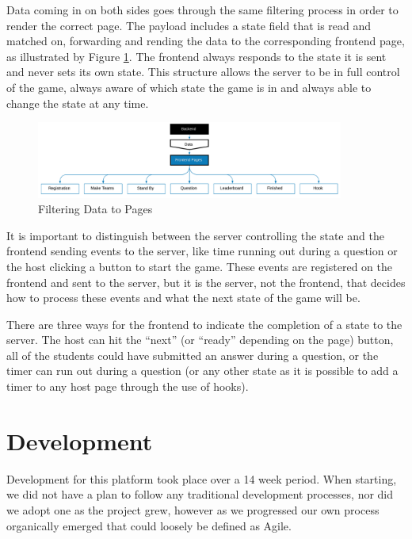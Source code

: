 \documentclass{article}
\begin{document}
            Data coming in on both sides goes through the same filtering process in order to render the correct page. The payload includes a state field that is read and matched on, forwarding and rending the data to the corresponding frontend page, as illustrated by Figure \ref{fig:frontend-pages}. The frontend always responds to the state it is sent and never sets its own state. This structure allows the server to be in full control of the game, always aware of which state the game is in and always able to change the state at any time.

            \begin{figure}[ht]
                \centering
                \includegraphics[width=0.9\textwidth]{images/frontend-pages.png}
                \caption{Filtering Data to Pages}
                \label{fig:frontend-pages}
            \end{figure}
            
            It is important to distinguish between the server controlling the state and the frontend sending events to the server, like time running out during a question or the host clicking a button to start the game. These events are registered on the frontend and sent to the server, but it is the server, not the frontend, that decides how to process these events and what the next state of the game will be.
            
            \smallskip
            There are three ways for the frontend to indicate the completion of a state to the server. The host can hit the ``next'' (or ``ready'' depending on the page) button, all of the students could have submitted an answer during a question, or the timer can run out during a question (or any other state as it is possible to add a timer to any host page through the use of hooks).

\section{Development}
    Development for this platform took place over a 14 week period. When starting, we did not have a plan to follow any traditional development processes, nor did we adopt one as the project grew, however as we progressed our own process organically emerged that could loosely be defined as Agile.
    \smallskip
    
\end{document}
